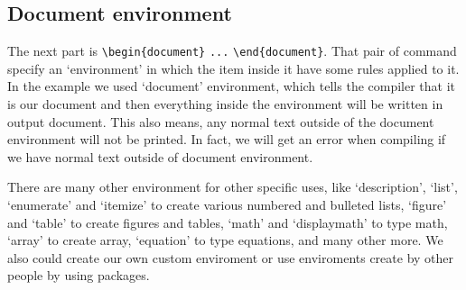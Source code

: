 \documentclass[conference]{IEEEtran}
\begin{document}
\subsection{Document environment}
    The next part is
    \texttt{\textbackslash begin\{document\}}
    \texttt{...}
    \texttt{\textbackslash end\{document\}}.
    That pair of command specify an `environment' in which the item inside it have
    some rules applied to it. In the example we used `document' environment,
    which tells the compiler that it is our document and then everything inside 
    the environment will be written in output document.
    This also means, any normal text outside of the document environment will
    not be printed. In fact, we will get an error when compiling if we have normal
    text outside of document environment. 

    There are many other environment for other specific uses,
    like `description', `list', `enumerate' and `itemize' to create
    various numbered and bulleted lists, `figure' and `table' to
    create figures and tables, `math' and `displaymath' to type math,
    `array' to create array, `equation' to type equations, and many
    other more. We also could create our own custom enviroment or
    use enviroments create by other people by using packages.
\end{document}

